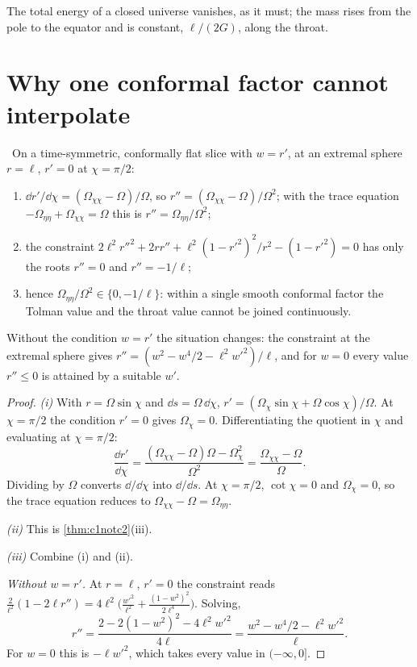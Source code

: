 The total energy of a closed universe vanishes, as it must; the mass rises from the pole to the equator and is constant, $\ell/(2G)$, along the throat.

\section{Why one conformal factor cannot interpolate}

\begin{theorem}\label{thm:twovalues}\ver\nogo\
On a time-symmetric, conformally flat slice with $w=r'$, at an extremal sphere $r=\ell$, $r'=0$ at $\chi=\pi/2$:
\begin{enumerate}[label=(\roman*)]
\item $\dd r'/\dd\chi=(\Omega_{\chi\chi}-\Omega)/\Omega$, so $r''=(\Omega_{\chi\chi}-\Omega)/\Omega^2$; with the trace equation $-\Omega_{\eta\eta}+\Omega_{\chi\chi}=\Omega$ this is $r''=\Omega_{\eta\eta}/\Omega^2$;
\item the constraint $2\ell^2r''^2+2rr''+\ell^2(1-r'^2)^2/r^2-(1-r'^2)=0$ has only the roots $r''=0$ and $r''=-1/\ell$;
\item hence $\Omega_{\eta\eta}/\Omega^2\in\{0,-1/\ell\}$: within a single smooth conformal factor the Tolman value and the throat value cannot be joined continuously.
\end{enumerate}
Without the condition $w=r'$ the situation changes: the constraint at the extremal sphere gives $r''=(w^2-w^4/2-\ell^2w'^2)/\ell$, and for $w=0$ every value $r''\le0$ is attained by a suitable $w'$.
\end{theorem}
\begin{proof}
\emph{(i)} With $r=\Omega\sin\chi$ and $\dd s=\Omega\,\dd\chi$, $r'=(\Omega_\chi\sin\chi+\Omega\cos\chi)/\Omega$. At $\chi=\pi/2$ the condition $r'=0$ gives $\Omega_\chi=0$. Differentiating the quotient in $\chi$ and evaluating at $\chi=\pi/2$:
\[
\frac{\dd r'}{\dd\chi}=\frac{(\Omega_{\chi\chi}-\Omega)\Omega-\Omega_\chi^2}{\Omega^2}=\frac{\Omega_{\chi\chi}-\Omega}\Omega .
\]
Dividing by $\Omega$ converts $\dd/\dd\chi$ into $\dd/\dd s$. At $\chi=\pi/2$, $\cot\chi=0$ and $\Omega_\chi=0$, so the trace equation reduces to $\Omega_{\chi\chi}-\Omega=\Omega_{\eta\eta}$.

\emph{(ii)} This is \cref{thm:c1notc2}(iii).

\emph{(iii)} Combine (i) and (ii).

\emph{Without $w=r'$.} At $r=\ell$, $r'=0$ the constraint reads $\frac2{\ell^2}(1-2\ell r'')=4\ell^2\bigl(\frac{w'^2}{\ell^2}+\frac{(1-w^2)^2}{2\ell^4}\bigr)$. Solving,
\[
r''=\frac{2-2(1-w^2)^2-4\ell^2w'^2}{4\ell}=\frac{w^2-w^4/2-\ell^2w'^2}\ell .
\]
For $w=0$ this is $-\ell w'^2$, which takes every value in $(-\infty,0]$.
\end{proof}


